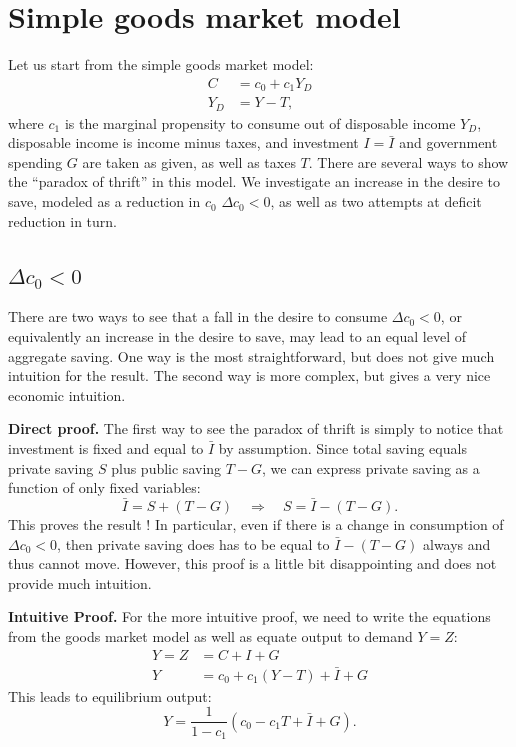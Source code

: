 \documentclass[]{book}
\begin{document}
\section{Simple goods market model}\label{simple-paradox-thrift}

Let us start from the simple goods market model: \[
\begin{aligned}
C   &=c_{0}+c_{1}Y_{D}\\
Y_{D}   &=Y-T,
\end{aligned}
\] where \(c_{1}\) is the marginal propensity to consume out of
disposable income \(Y_{D}\), disposable income is income minus taxes,
and investment \(I=\bar{I}\) and government spending \(G\) are taken as
given, as well as taxes \(T\). There are several ways to show the
``paradox of thrift'' in this model. We investigate an increase in the
desire to save, modeled as a reduction in \(c_0\) \(\Delta c_0<0\), as
well as two attempts at deficit reduction in turn.

\subsection{\texorpdfstring{\(\Delta c_{0}<0\)}{\textbackslash{}Delta c\_\{0\}\textless{}0}}\label{delta-c_00}

There are two ways to see that a fall in the desire to consume
\(\Delta c_0 <0\), or equivalently an increase in the desire to save,
may lead to an equal level of aggregate saving. One way is the most
straightforward, but does not give much intuition for the result. The
second way is more complex, but gives a very nice economic intuition.

\textbf{Direct proof.} The first way to see the paradox of thrift is
simply to notice that investment is fixed and equal to \(\bar{I}\) by
assumption. Since total saving equals private saving \(S\) plus public
saving \(T-G\), we can express private saving as a function of only
fixed variables:
\[\bar{I}=S+\left(T-G\right)\quad\Rightarrow\quad S=\bar{I}-\left(T-G\right).\]
This proves the result ! In particular, even if there is a change in
consumption of \(\Delta c_{0}<0\), then private saving does has to be
equal to \(\bar{I}-\left(T-G\right)\) always and thus cannot move.
However, this proof is a little bit disappointing and does not provide
much intuition.

\textbf{Intuitive Proof.} For the more intuitive proof, we need to write
the equations from the goods market model as well as equate output to
demand \(Y=Z\): \[\begin{aligned}
Y   =Z&=C+I+G\\
Y   &=c_{0}+c_{1}(Y-T)+\bar{I}+G
\end{aligned}\] This leads to equilibrium output:
\[Y=\frac{1}{1-c_{1}}\left(c_{0}-c_{1}T+\bar{I}+G\right).\]
\end{document}
